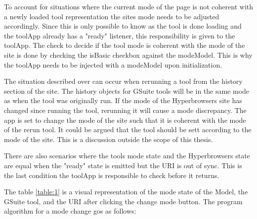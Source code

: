 \documentclass[english]{ifimaster}
\begin{document}
To account for situations where the current mode of the page is not coherent with a newly loaded tool representation the sites mode needs to be adjusted accordingly. Since this is only possible to know as the tool is done loading and the toolApp already has a "ready" listener, this responsibility is given to the toolApp. The check to decide if the tool mode is coherent with the mode of the site is done by checking the isBasic checkbox against the modeModel. This is why the toolApp needs to be injected with a modeModel upon initialization. 

The situation described over can occur when rerunning a tool from the history section of the site. The history objects for GSuite tools will be in the same mode as when the tool was originally run. If the mode of the Hyperbrowsers site has changed since running the tool, rerunning it will cause a mode discrepancy. The app is set to change the mode of the site such that it is coherent with the mode of the rerun tool. It could be argued that the tool should be sett according to the mode of the site. This is a discussion outside the scope of this thesis.

There are also scenarios where the tools mode state and the Hyperbrowsers state are equal when the "ready" state is emitted but the URI is out of sync. This is the last condition the toolApp is responsible to check before it returns.


The table \ref{table:1} is a visual representation of the mode state of the Model, the GSuite tool, and the URI after clicking the change mode button. The program algorithm for a mode change gos as follows:
\end{document}
